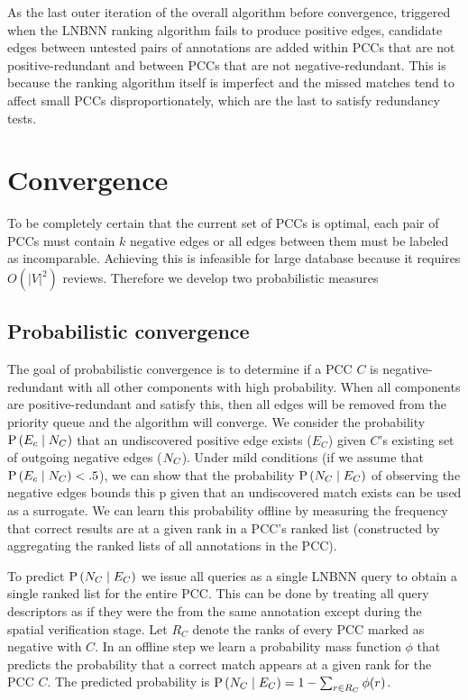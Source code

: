 As the last outer iteration of the overall algorithm before convergence, triggered when the LNBNN ranking algorithm
fails to produce positive edges, candidate edges between untested pairs of annotations are added within PCCs that are
not positive-redundant and between PCCs that are not negative-redundant. This is because the ranking algorithm itself is
imperfect and the missed matches tend to affect small PCCs disproportionately, which are the last to satisfy redundancy
tests.


\section{Convergence}\label{sec:coverge}

To be completely certain that the current set of PCCs is optimal, each pair of
PCCs must contain $k$ negative edges or all edges between them must be labeled
as incomparable. Achieving this is infeasible for large database because it
requires $O(|V|^2)$ reviews. Therefore we develop two probabilistic measures 


\subsection{Probabilistic convergence}
The goal of probabilistic convergence is to determine if a PCC $C$ is negative-redundant with all other components with
high probability. When all components are positive-redundant and satisfy this, then all edges will be removed from the
priority queue and the algorithm will converge. We consider the probability $\mathbin{\mathbin{\operatorname{P}}}\left(E_c \mid N_C\right)$ that an undiscovered
positive edge exists ($E_C$) given $C$'s existing set of outgoing negative edges ($N_C$). Under mild conditions (if we
assume that $\mathbin{\mathbin{\operatorname{P}}}\left(E_c \mid N_C\right) < .5$), we can show that the probability $\mathbin{\mathbin{\operatorname{P}}}\left(N_C \mid E_C\right)$ of observing the
negative edges bounds this p given that an undiscovered match exists can be used as a surrogate. We can learn this
probability offline by measuring the frequency that correct results are at a given rank in a PCC's ranked list
(constructed by aggregating the ranked lists of all annotations in the PCC).

To predict $\mathbin{\mathbin{\operatorname{P}}}\left(N_C \mid E_C\right)$ we issue all queries as a single LNBNN query to obtain a single ranked list for the
entire PCC. This can be done by treating all query descriptors as if they were the from the same annotation except
during the spatial verification stage. Let $R_C$ denote the ranks of every PCC marked as negative with $C$. In an
offline step we learn a probability mass function $\phi$ that predicts the probability that a correct match appears at a
given rank for the PCC $C$. The predicted probability is %
$\mathbin{\mathbin{\operatorname{P}}}\left(N_C \mid E_C\right) = 1 - \sum_{r \in R_C} \phi(r)$.

